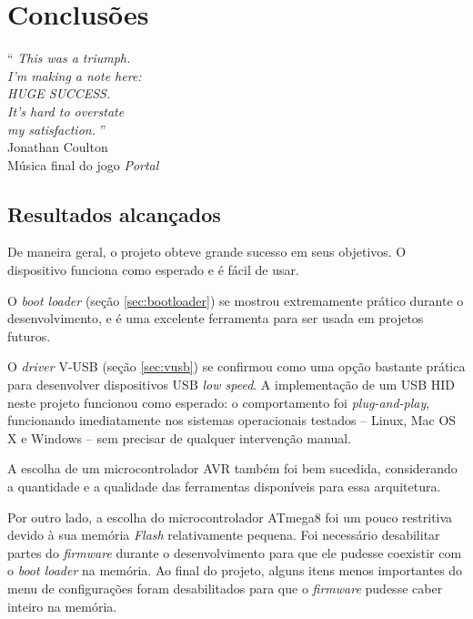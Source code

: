 \documentclass[brazil,pagestart=firstchapter]{abnt}
\begin{document}
\chapter{Conclusões}
\label{cap:conclusoes}


\vfill{}
\begin{flushright}{}
``\emph{
	This was a triumph.    \\
	I'm making a note here:\\
	HUGE SUCCESS.          \\
	It's hard to overstate \\
	my satisfaction.
}''\\
{\small Jonathan Coulton} \\
{\small Música final do jogo \textit{Portal}}
\end{flushright}{\small \par}
\vfill{}

\newpage


\section{Resultados alcançados}
\label{sec:resultados}

De maneira geral, o projeto obteve grande sucesso em seus objetivos. O
dispositivo funciona como esperado e é fácil de usar.

O \textit{boot loader} (seção \ref{sec:bootloader}) se mostrou extremamente
prático durante o desenvolvimento, e é uma excelente ferramenta para ser
usada em projetos futuros.

O \textit{driver} V-USB (seção \ref{sec:vusb}) se confirmou como uma opção
bastante prática para desenvolver dispositivos \ac{USB} \textit{low speed}.
A implementação de um \ac{USB} \ac{HID} neste projeto funcionou como
esperado: o comportamento foi \textit{plug-and-play}, funcionando
imediatamente nos sistemas operacionais testados -- Linux, Mac OS X e
Windows -- sem precisar de qualquer intervenção manual.

A escolha de um microcontrolador AVR também foi bem sucedida, considerando a
quantidade e a qualidade das ferramentas disponíveis para essa arquitetura.

Por outro lado, a escolha do microcontrolador ATmega8 foi um pouco
restritiva devido à sua memória \textit{Flash} relativamente pequena. Foi
necessário desabilitar partes do \textit{firmware} durante o
desenvolvimento para que ele pudesse coexistir com o \textit{boot loader} na
memória. Ao final do projeto, alguns itens menos importantes do menu de
configurações foram desabilitados para que o \textit{firmware} pudesse caber
inteiro na memória.
\end{document}
